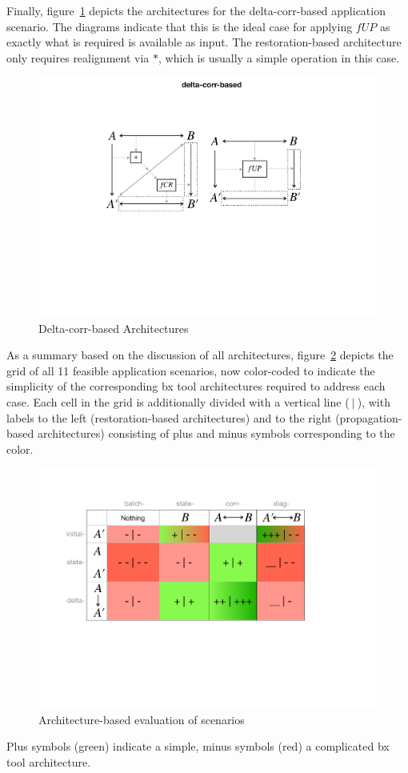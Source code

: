 Finally, figure~\ref{fig:deltaCorrBased} depicts the architectures for the delta-corr-based application scenario.
The diagrams indicate that this is the ideal case for applying $fUP$ as exactly what is required is available as input.
The restoration-based architecture only requires realignment via $\ast$, which is usually a simple operation in this case.
\begin{figure}[tb!]
	\centering
	\includegraphics[width=0.75\columnwidth]{diagrams/foundations/delta-corr-based}
	\caption{Delta-corr-based Architectures}
	\label{fig:deltaCorrBased}
\end{figure}

As a summary based on the discussion of all architectures, figure~\ref{fig:evalOfApplicationScenarios} depicts the grid of all 11 feasible application scenarios, now color-coded to indicate the simplicity of the corresponding bx tool architectures required to address each case.
Each cell in the grid is additionally divided with a vertical line ($~|~$), with labels to the left (restoration-based architectures) and to the right (propagation-based architectures) consisting of plus and minus symbols corresponding to the color.
\begin{figure}[tb!]
	\centering
	\includegraphics[width=0.9\columnwidth]{diagrams/foundations/EvalOfApplicationScenarios.pdf}
	\caption{Architecture-based evaluation of scenarios}
	\label{fig:evalOfApplicationScenarios}
\end{figure}
Plus symbols (green) indicate a simple, minus symbols (red) a complicated bx tool architecture.  

